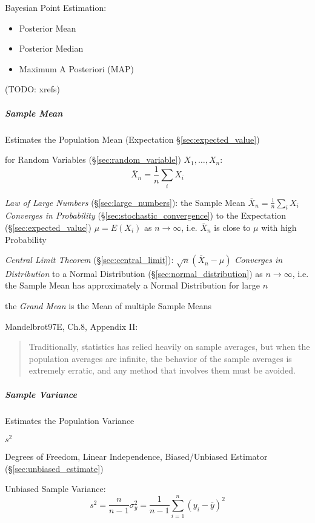 Bayesian Point Estimation:
\begin{itemize}
  \item Posterior Mean
  \item Posterior Median
  \item Maximum A Posteriori (MAP)
\end{itemize}

(TODO: xrefs)



\subparagraph{Sample Mean}\label{sec:sample_mean}

Estimates the Population Mean (Expectation \S\ref{sec:expected_value})

for Random Variables (\S\ref{sec:random_variable}) $X_1, \ldots, X_n$:
\[
  \overline{X}_n = \frac{1}{n}\sum_i X_i
\]

\emph{Law of Large Numbers} (\S\ref{sec:large_numbers}): the Sample Mean
$\overline{X}_n = \frac{1}{n}\sum_i X_i$ \emph{Converges in Probability}
(\S\ref{sec:stochastic_convergence}) to the Expectation
(\S\ref{sec:expected_value}) $\mu = E(X_i)$ as $n \to \infty$, i.e.
$\overline{X}_n$ is close to $\mu$ with high Probability

\emph{Central Limit Theorem} (\S\ref{sec:central_limit}):
$\sqrt{n}(\overline{X}_n - \mu)$ \emph{Converges in Distribution} to a Normal
Distribution (\S\ref{sec:normal_distribution}) as $n \to \infty$, i.e.
the Sample Mean has approximately a Normal Distribution for large $n$

the \emph{Grand Mean} is the Mean of multiple Sample Means

Mandelbrot97E, Ch.8, Appendix II:
\begin{quote}
  Traditionally, statistics has relied heavily on sample averages, but when the
  population averages are infinite, the behavior of the sample averages is
  extremely erratic, and any method that involves them must be avoided.
\end{quote}



\subparagraph{Sample Variance}\label{sec:sample_variance}\hfill

Estimates the Population Variance

$s^2$

Degrees of Freedom, Linear Independence, Biased/Unbiased Estimator
(\S\ref{sec:unbiased_estimate})

Unbiased Sample Variance:
\[
  s^2 = \frac{n}{n-1}\sigma^2_y =
  \frac{1}{n-1} \sum_{i=1}^n (y_i - \overline{y})^2
\]




